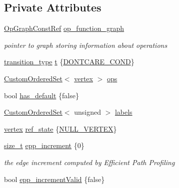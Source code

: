\subsection*{Private Attributes}
\begin{DoxyCompactItemize}
\item 
\hyperlink{op__graph_8hpp_a9a0b240622c47584bee6951a6f5de746}{Op\+Graph\+Const\+Ref} \hyperlink{classTransitionInfo_afb75a6d60b513f6e76a01a9fff783648}{op\+\_\+function\+\_\+graph}
\begin{DoxyCompactList}\small\item\em pointer to graph storing information about operations \end{DoxyCompactList}\item 
\hyperlink{state__transition__graph_8hpp_a73ce4c522d9c8d45a7e1ab48c95a1710}{transition\+\_\+type} \hyperlink{classTransitionInfo_a020b2feab25a20dedf5f735274940c82}{t} \{\hyperlink{state__transition__graph_8hpp_a73ce4c522d9c8d45a7e1ab48c95a1710a7a82876d2d9c7341c35e7d122536b54f}{D\+O\+N\+T\+C\+A\+R\+E\+\_\+\+C\+O\+ND}\}
\item 
\hyperlink{classCustomOrderedSet}{Custom\+Ordered\+Set}$<$ \hyperlink{graph_8hpp_abefdcf0544e601805af44eca032cca14}{vertex} $>$ \hyperlink{classTransitionInfo_a9cae3532489545307b89372045ebb5b5}{ops}
\item 
bool \hyperlink{classTransitionInfo_ae843bc9fbd237657c7b96a373ef6fcd3}{has\+\_\+default} \{false\}
\item 
\hyperlink{classCustomOrderedSet}{Custom\+Ordered\+Set}$<$ unsigned $>$ \hyperlink{classTransitionInfo_acc87867ed33c5190b1558effa4f08306}{labels}
\item 
\hyperlink{graph_8hpp_abefdcf0544e601805af44eca032cca14}{vertex} \hyperlink{classTransitionInfo_ae886125493b01b32ad8638e40d6bbdd5}{ref\+\_\+state} \{\hyperlink{graph_8hpp_ac3c33c45c396860b76e8aff4dd2b8158}{N\+U\+L\+L\+\_\+\+V\+E\+R\+T\+EX}\}
\item 
\hyperlink{tutorial__fpt__2017_2intro_2sixth_2test_8c_a7c94ea6f8948649f8d181ae55911eeaf}{size\+\_\+t} \hyperlink{classTransitionInfo_a793e7ed8a189939607bf234495423db8}{epp\+\_\+increment} \{0\}
\begin{DoxyCompactList}\small\item\em the edge increment computed by Efficient Path Profiling \end{DoxyCompactList}\item 
bool \hyperlink{classTransitionInfo_aa24fc61332bd16f40d91ee3944c4e144}{epp\+\_\+increment\+Valid} \{false\}
\end{DoxyCompactItemize}
